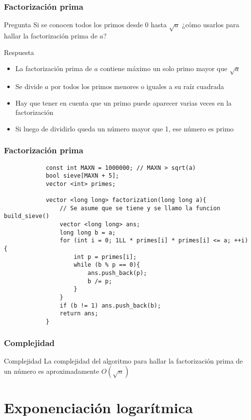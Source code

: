 \documentclass{beamer}
\begin{document}
	\begin{frame}
		\frametitle{Factorización prima}
		\begin{alertblock}{Pregunta}
			Si se conocen todos los primos desde 0 hasta $\sqrt{a}$ ¿cómo usarlos para hallar la factorización prima de $a$?
		\end{alertblock}
		\pause
		\begin{exampleblock}{Respuesta}
			\begin{itemize}
				\item La factorización prima de $a$ contiene máximo un solo primo mayor que $\sqrt{a}$
				\item Se divide $a$ por todos los primos menores o iguales a su raíz cuadrada
				\item Hay que tener en cuenta que un primo puede aparecer varias veces en la factorización
				\item Si luego de dividirlo queda un número mayor que 1, ese número es primo
			\end{itemize}
		\end{exampleblock}
	\end{frame}

	\begin{frame}[fragile]
		\frametitle{Factorización prima}
		\begin{lstlisting}
			const int MAXN = 1000000; // MAXN > sqrt(a)
			bool sieve[MAXN + 5];
			vector <int> primes;
			
			vector <long long> factorization(long long a){
			    // Se asume que se tiene y se llamo la funcion build_sieve()
			    vector <long long> ans;
			    long long b = a;
			    for (int i = 0; 1LL * primes[i] * primes[i] <= a; ++i){
			        int p = primes[i];
			        while (b % p == 0){
			            ans.push_back(p);
			            b /= p;
			        }
			    }
			    if (b != 1) ans.push_back(b);
			    return ans;
			}
		\end{lstlisting}
	\end{frame}
	
	\begin{frame}
		\frametitle{Complejidad}
		\begin{block}{Complejidad}
			La complejidad del algoritmo para hallar la factorización prima de un número es aproximadamente $O(\sqrt{n})$
		\end{block}
	\end{frame}


\section[Bigmod]{Exponenciación logarítmica}
\end{document}

